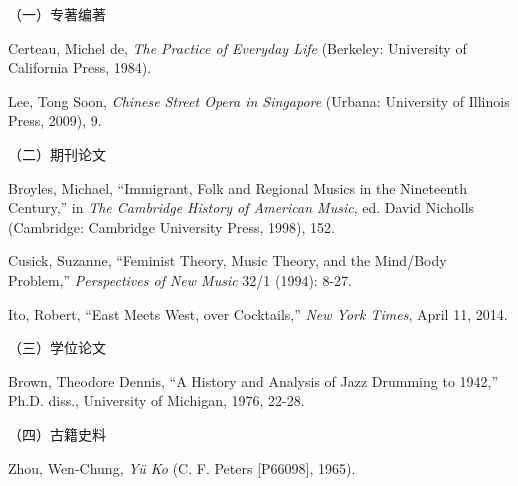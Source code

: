 \noindent （一）专著编著

\begin{achievements}
\item Certeau, Michel de, \textit{The Practice of Everyday Life} (Berkeley: University of California Press, 1984).
\item Lee, Tong Soon, \textit{Chinese Street Opera in Singapore} (Urbana: University of Illinois Press, 2009), 9.
\end{achievements}

\noindent （二）期刊论文

\begin{achievements}
\item Broyles, Michael, “Immigrant, Folk and Regional Musics in the Nineteenth Century,” in \textit{The Cambridge History of American Music}, ed. David Nicholls (Cambridge: Cambridge University Press, 1998), 152.
\item Cusick, Suzanne, “Feminist Theory, Music Theory, and the Mind/Body Problem,” \textit{Perspectives of New Music} 32/1 (1994): 8-27.
\item Ito, Robert, “East Meets West, over Cocktails,” \textit{New York Times}, April 11, 2014.
\end{achievements}

\noindent （三）学位论文

\begin{achievements}
\item Brown, Theodore Dennis, “A History and Analysis of Jazz Drumming to 1942,” Ph.D. diss., University of Michigan, 1976, 22-28.
\end{achievements}

\noindent （四）古籍史料

\begin{achievements}
\item Zhou, Wen-Chung, \textit{Yü Ko} (C. F. Peters [P66098], 1965).
\end{achievements}
